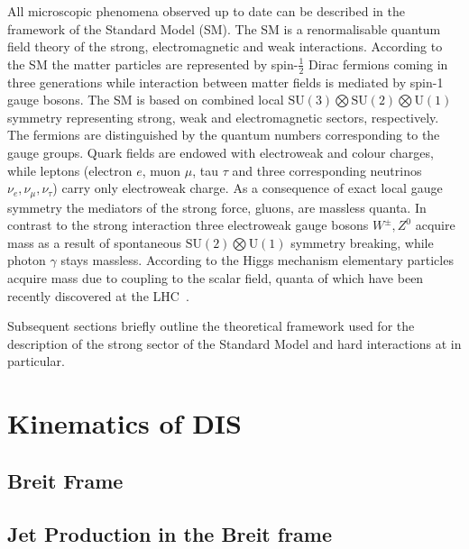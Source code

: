 All microscopic phenomena observed up to date can be described in the framework of the Standard Model (SM). The SM is a renormalisable quantum field theory of the strong, electromagnetic and weak interactions. According to the SM the matter particles are represented by spin-$\frac{1}{2}$ Dirac fermions coming in three generations while interaction between matter fields is mediated by spin-1 gauge bosons. The SM is based on combined local $\mathrm{SU}\left(3\right) \bigotimes \mathrm{SU}\left(2\right) \bigotimes \mathrm{U}\left(1\right)$ symmetry representing strong, weak and electromagnetic sectors, respectively. The fermions are distinguished by the quantum numbers corresponding to the gauge groups. Quark fields are endowed with electroweak and colour charges, while leptons (electron $e$, muon $\mu$, tau $\tau$ and three corresponding neutrinos $\nu_e, \nu_\mu, \nu_\tau$) carry only electroweak charge. As a consequence of exact local gauge symmetry the mediators of the strong force, gluons, are massless quanta. In contrast to the strong interaction three electroweak gauge bosons $W^\pm, Z^0$ acquire mass as a result of spontaneous $\mathrm{SU}\left(2\right) \bigotimes \mathrm{U}\left(1\right)$ symmetry breaking, while photon $\gamma$ stays massless. According to the Higgs mechanism elementary particles acquire mass due to coupling to the scalar field, quanta of which have been recently discovered at the LHC~\cite{higgs atlas cms}.

Subsequent sections briefly outline the theoretical framework used for the description of the strong sector of the Standard Model and hard interactions at \hera in particular.

\section{Kinematics of DIS}
\label{sec:kindis}


\subsection{Breit Frame}
\label{subsec:breitframe}


\subsection{Jet Production in the Breit frame}
\label{subsec:jetsinbreit}


